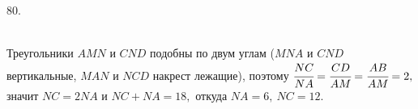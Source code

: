 80. \begin{figure}[ht!]
\end{figure}\\
Треугольники $AMN$ и $CND$ подобны по двум углам ($MNA$ и $CND$ вертикальные, $MAN$ и $NCD$ накрест лежащие), поэтому $\cfrac{NC}{NA}=\cfrac{CD}{AM}=\cfrac{AB}{AM}=2,$ значит $NC=2NA$ и $NC+NA=18,$ откуда $NA=6,\ NC=12.$\\

